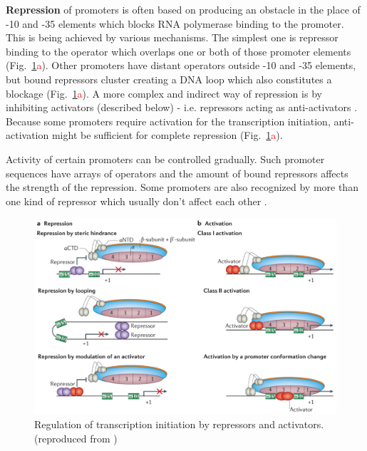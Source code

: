 \textbf{Repression} of promoters is often based on producing an obstacle in the place of -10 and -35 elements which blocks RNA polymerase binding to the promoter.
This is being achieved by various mechanisms.
The simplest one is repressor binding to the operator which overlaps one or both of those promoter elements \cite{brent1981mechanism} (Fig.~\ref{txn}\textcolor{red}{a}).
Other promoters have distant operators outside -10 and -35 elements, but bound repressors cluster creating a DNA loop which also constitutes a blockage \cite{semsey2004dna} (Fig.~\ref{txn}\textcolor{red}{a}).
A more complex and indirect way of repression is by inhibiting activators (described below) - i.e. repressors acting as anti-activators \cite{sogaard1993protein}.
Because some promoters require activation for the transcription initiation, anti-activation might be sufficient for complete repression (Fig.~\ref{txn}\textcolor{red}{a}).

Activity of certain promoters can be controlled gradually.
Such promoter sequences have arrays of operators and the amount of bound repressors affects the strength of the repression.
Some promoters are also recognized by more than one kind of repressor which usually don't affect each other \cite{el2009repression}.

\begin{figure}[ht!]
  \centering
  \includegraphics[scale=0.4]{text/Pictures/TxnInitRegulation.png}
	\caption{Regulation of transcription initiation by repressors and activators. (reproduced from \cite{browning2016local})}
	\label{txn}
\end{figure}

